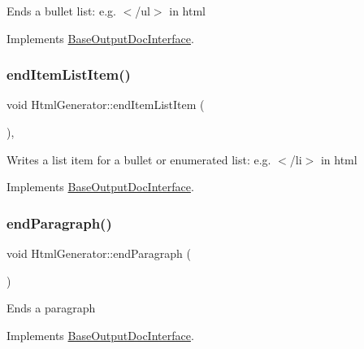 Ends a bullet list\+: e.\+g. {\ttfamily $<$/ul$>$} in html 

Implements \mbox{\hyperlink{class_base_output_doc_interface_a3493b65672bf134033bd3bb296acdff4}{Base\+Output\+Doc\+Interface}}.

\mbox{\label{class_html_generator_a91f6100cb025e52c1cef35b8749761b2}} 
\subsubsection{\texorpdfstring{endItemListItem()}{endItemListItem()}}
{\footnotesize\ttfamily void Html\+Generator\+::end\+Item\+List\+Item (\begin{DoxyParamCaption}{ }\end{DoxyParamCaption})\hspace{0.3cm}{\ttfamily [inline]}, {\ttfamily [virtual]}}

Writes a list item for a bullet or enumerated list\+: e.\+g. {\ttfamily $<$/li$>$} in html 

Implements \mbox{\hyperlink{class_base_output_doc_interface_a90d290d7a06a9e7ecd968c8da90ed665}{Base\+Output\+Doc\+Interface}}.

\mbox{\label{class_html_generator_a48e5516f348a9ec6ed456a6a3b003af3}} 
\subsubsection{\texorpdfstring{endParagraph()}{endParagraph()}}
{\footnotesize\ttfamily void Html\+Generator\+::end\+Paragraph (\begin{DoxyParamCaption}{ }\end{DoxyParamCaption})\hspace{0.3cm}{\ttfamily [virtual]}}

Ends a paragraph 

Implements \mbox{\hyperlink{class_base_output_doc_interface_ab76280c2eb451ad160991707206b6c95}{Base\+Output\+Doc\+Interface}}.

\mbox{\label{class_html_generator_a574b29296b93ffa4c3b119cbee70269c}} 
